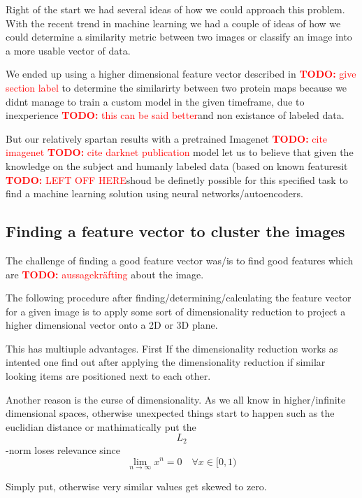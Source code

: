 \documentclass[journal]{vgtc}       %
\newcommand{\todo}[1]{\textcolor{red}{\textbf{TODO:} #1}}
\begin{document}
Right of the start we had several ideas of how we could approach this problem. 
With the recent trend in machine learning we had a couple of ideas of how we could determine a similarity metric between two images or classify an image into a more usable vector of data.

We ended up using a higher dimensional feature vector described in \todo{give section label} to determine the similarirty between two protein maps because we didnt manage to train a custom model in the given timeframe, due to inexperience \todo{this can be said better}and non existance of labeled data.

But our relatively spartan results with a pretrained Imagenet \todo{cite imagenet} \cite{imagenet} \todo{cite darknet publication}  model let us to believe that given the knowledge on the subject and humanly labeled data (based on known featuresit \todo{LEFT OFF HERE}shoud be definetly possible for this specified task to find a machine learning  solution using neural networks/autoencoders.

\subsection{Finding a feature vector to cluster the images}

The challenge of finding a good feature vector was/is to find good features which are \todo{aussagekräfting} about the image.

The following procedure after finding/determining/calculating the feature vector for a given image is to apply some sort of dimensionality reduction to project a higher dimensional vector onto a 2D or 3D plane.

This has multiuple advantages. First If the dimensionality reduction works as intented one find out after applying the dimensionality reduction if similar looking items are positioned next to each other.

Another reason is the curse of dimensionality. As we all know in higher/infinite dimensional spaces, otherwise unexpected things start to happen such as the euclidian distance or mathimatically put the \begin{equation} L_2 \end{equation}-norm loses relevance since
\begin{equation}
\lim_{n\rightarrow \infty} x^n = 0 \quad \forall x \in [0,1)
\end{equation}

Simply put, otherwise very similar values get skewed to zero.
\end{document}
